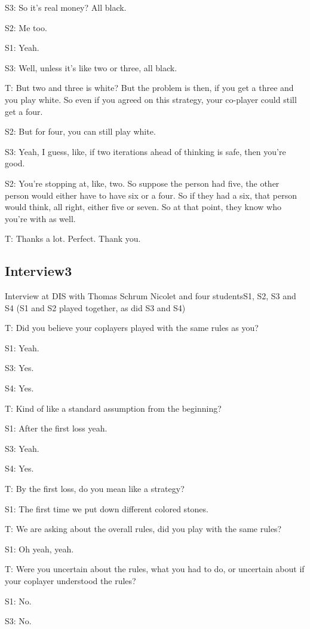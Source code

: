 \documentclass[a4paper,superscriptaddress,nofootinbib]{revtex4}
\begin{document}
S3: So it's real money? All black. 

S2: Me too.

S1: Yeah. 

S3: Well, unless it's like two or three, all black.

T: But two and three is white? But the problem is then, if you get a three and you play white. So even if you agreed on this strategy, your co-player could still get a four.

S2: But for four, you can still play white.

S3: Yeah, I guess, like, if two iterations ahead of thinking is safe, then you're good. 

S2: You're stopping at, like, two. So suppose the person had five, the other person would either have to have six or a four. So if they had a six, that person would think, all right, either five or seven. So at that point, they know who you're with as well. 

T: Thanks a lot. Perfect. Thank you.


\subsection*{Interview3}
Interview at DIS with Thomas Schrum Nicolet and four studentsS1, S2, S3 and S4 (S1 and S2 played together, as did S3 and S4)

\medskip
T: Did you believe your coplayers played with the same rules as you?

S1: Yeah.

S3: Yes.

S4: Yes.

T: Kind of like a standard assumption from the beginning?

S1: After the first loss yeah.

S3: Yeah.

S4: Yes.

T: By the first loss, do you mean like a strategy?

S1: The first time we put down different colored stones.

T: We are asking about the overall rules, did you play with the same rules?

S1: Oh yeah, yeah.

T: Were you uncertain about the rules, what you had to do, or uncertain about if your coplayer understood the rules?

S1: No.

S3: No.
\end{document}
